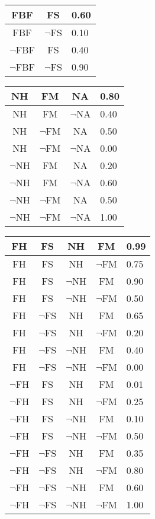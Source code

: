 \documentclass[12pt]{article}
\begin{document}
\begin{tabular}{|c|c|l|}
\hline
FBF &  FS & 0.60 \\ \hline
FBF & $\lnot$FS & 0.10 \\ \hline
$\lnot$FBF &  FS & 0.40 \\ \hline
$\lnot$FBF & $\lnot$FS & 0.90 \\ \hline
\end{tabular} \vspace{5mm}

\begin{tabular}{|c|c|c|l|}
\hline
NH  &  FM &  NA & 0.80 \\ \hline
NH  &  FM & $\lnot$NA & 0.40 \\ \hline
NH  & $\lnot$FM &  NA & 0.50 \\ \hline
NH  & $\lnot$FM & $\lnot$NA & 0.00 \\ \hline
$\lnot$NH  &  FM &  NA & 0.20 \\ \hline
$\lnot$NH  &  FM & $\lnot$NA & 0.60 \\ \hline
$\lnot$NH  & $\lnot$FM &  NA & 0.50 \\ \hline
$\lnot$NH  & $\lnot$FM & $\lnot$NA & 1.00 \\ \hline
\end{tabular} \vspace{5mm}

\begin{tabular}{|c|c|c|c|l|}
\hline
FH  &  FS &  NH &  FM & 0.99 \\ \hline
FH  &  FS &  NH & $\lnot$FM & 0.75 \\ \hline
FH  &  FS & $\lnot$NH &  FM & 0.90 \\ \hline
FH  &  FS & $\lnot$NH & $\lnot$FM & 0.50 \\ \hline
FH  & $\lnot$FS &  NH &  FM & 0.65 \\ \hline
FH  & $\lnot$FS &  NH & $\lnot$FM & 0.20 \\ \hline
FH  & $\lnot$FS & $\lnot$NH &  FM & 0.40 \\ \hline
FH  & $\lnot$FS & $\lnot$NH & $\lnot$FM & 0.00 \\ \hline
$\lnot$FH  &  FS &  NH &  FM & 0.01 \\ \hline
$\lnot$FH  &  FS &  NH & $\lnot$FM & 0.25 \\ \hline
$\lnot$FH  &  FS & $\lnot$NH &  FM & 0.10 \\ \hline
$\lnot$FH  &  FS & $\lnot$NH & $\lnot$FM & 0.50 \\ \hline
$\lnot$FH  & $\lnot$FS &  NH &  FM & 0.35 \\ \hline
$\lnot$FH  & $\lnot$FS &  NH & $\lnot$FM & 0.80 \\ \hline
$\lnot$FH  & $\lnot$FS & $\lnot$NH &  FM & 0.60 \\ \hline
$\lnot$FH  & $\lnot$FS & $\lnot$NH & $\lnot$FM & 1.00 \\ \hline
\end{tabular} \vspace{5mm}
\end{document}
